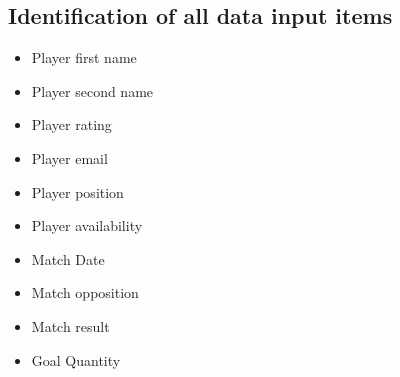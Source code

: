 \subsection{Identification of all data input items}
\begin{itemize}
\item Player first name
\item Player second name
\item Player rating
\item Player email
\item Player position
\item Player availability
\item Match Date
\item Match opposition
\item Match result
\item Goal Quantity 

\end{itemize}

